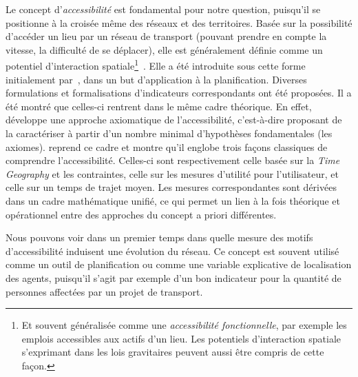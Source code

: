 {Le concept d'\emph{accessibilité} est fondamental pour notre question, puisqu'il se positionne à la croisée même des réseaux et des territoires. Basée sur la possibilité d'accéder un lieu par un réseau de transport (pouvant prendre en compte la vitesse, la difficulté de se déplacer), elle est généralement définie comme un potentiel d'interaction spatiale\footnote{Et souvent généralisée comme une \emph{accessibilité fonctionnelle}, par exemple les emplois accessibles aux actifs d'un lieu. Les potentiels d'interaction spatiale s'exprimant dans les lois gravitaires peuvent aussi être compris de cette façon.}~\cite{bavoux2005geographie}. Elle a été introduite sous cette forme initialement par~\cite{hansen1959accessibility}, dans un but d'application à la planification. Diverses formulations et formalisations d'indicateurs correspondants ont été proposées. Il a été montré que celles-ci rentrent dans le même cadre théorique. En effet, \cite{weibull1976axiomatic} développe une approche axiomatique de l'accessibilité, c'est-à-dire proposant de la caractériser à partir d'un nombre minimal d'hypothèses fondamentales (les axiomes). \cite{miller1999measuring} reprend ce cadre et montre qu'il englobe trois façons classiques de comprendre l'accessibilité. Celles-ci sont respectivement celle basée sur la \emph{Time Geography} et les contraintes, celle sur les mesures d'utilité pour l'utilisateur, et celle sur un temps de trajet moyen. Les mesures correspondantes sont dérivées dans un cadre mathématique unifié, ce qui permet un lien à la fois théorique et opérationnel entre des approches du concept a priori différentes.
}


\bpar{}
{
Nous pouvons voir dans un premier temps dans quelle mesure des motifs d'accessibilité induisent une évolution du réseau. Ce concept est souvent utilisé comme un outil de planification ou comme une variable explicative de localisation des agents, puisqu'il s'agit par exemple d'un bon indicateur pour la quantité de personnes affectées par un projet de transport.}


